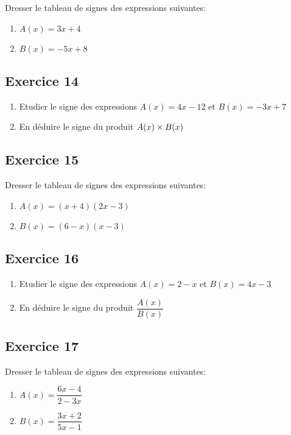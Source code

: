 \documentclass[12pt,a4paper]{article}
\begin{document}
Dresser le tableau de signes des expressions suivantes:
\begin{enumerate}
    \item $A(x)=3x+4$
    \item $B(x)=-5x+8$
\end{enumerate}

\subsection*{Exercice 14}

\begin{enumerate}
    \item Etudier le signe des expressions $A(x)=4x-12$ et $B(x)=-3x+7$
    \item En déduire le signe du produit $A(x)\times B(x)$
    
\end{enumerate}

\subsection*{Exercice 15}

Dresser le tableau de signes des expressions suivantes:
\begin{enumerate}
    \item $A(x)=(x+4)(2x-3)$
    \item $B(x)=(6-x)(x-3)$
\end{enumerate}



\subsection*{Exercice 16}

\begin{enumerate}
    \item Etudier le signe des expressions $A(x)=2-x$ et $B(x)=4x-3$
    \item En déduire le signe du produit $\dfrac{A(x)}{ B(x)}$
    
\end{enumerate}

\subsection*{Exercice 17}

Dresser le tableau de signes des expressions suivantes:
\begin{enumerate}
    \item $A(x)=\dfrac{6x-4}{2-3x}$
    \item $B(x)=\dfrac{3x+2}{5x-1}$
\end{enumerate}
\end{document}
